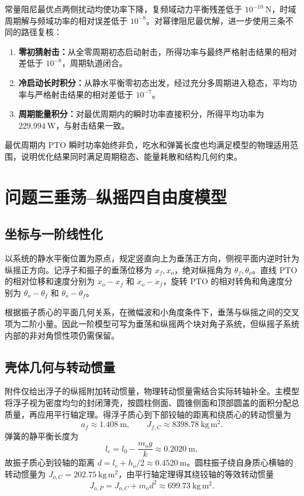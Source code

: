 \documentclass[withoutpreface]{../../../templates/CUMCM2026-Complete-LaTeX/cumcmthesis}
\begin{document}
常量阻尼最优点两侧扰动均使功率下降，复频域动力平衡残差低于 $10^{-10}\ \mathrm{N}$，时域周期解与频域功率的相对误差低于 $10^{-8}$。对幂律阻尼最优解，进一步使用三条不同的路径复核：
\begin{enumerate}[leftmargin=3.2em]
  \item \textbf{零初猜射击：}从全零周期初态启动射击，所得功率与最终严格射击结果的相对差低于 $10^{-8}$，周期轨道闭合。
  \item \textbf{冷启动长时积分：}从静水平衡零初态出发，经过充分多周期进入稳态，平均功率与严格射击结果的相对差低于 $10^{-7}$。
  \item \textbf{周期能量积分：}对最优周期内的瞬时功率直接积分，所得平均功率为 $229.994\ \mathrm{W}$，与射击结果一致。
\end{enumerate}
最优周期内 PTO 瞬时功率始终非负，吃水和弹簧长度也均满足模型的物理适用范围，说明优化结果同时满足周期稳态、能量耗散和结构几何约束。

\section{问题三垂荡--纵摇四自由度模型}

\subsection{坐标与一阶线性化}

以系统的静水平衡位置为原点，规定竖直向上为垂荡正方向，侧视平面内逆时针为纵摇正方向。记浮子和振子的垂荡位移为 $x_f,x_o$，绝对纵摇角为 $\theta_f,\theta_o$。直线 PTO 的相对位移和速度分别为 $x_o-x_f$ 和 $\dot x_o-\dot x_f$，旋转 PTO 的相对转角和角速度分别为 $\theta_o-\theta_f$ 和 $\dot\theta_o-\dot\theta_f$。

根据振子质心的平面几何关系，在微幅波和小角度条件下，垂荡与纵摇之间的交叉项为二阶小量。因此一阶模型可写为垂荡和纵摇两个块对角子系统，但纵摇子系统内部的非对角惯性项仍需保留。

\subsection{壳体几何与转动惯量}

附件仅给出浮子的纵摇附加转动惯量，物理转动惯量需结合实际转轴补全。主模型将浮子视为密度均匀的封闭薄壳，按圆柱侧面、圆锥侧面和顶部圆盖的面积分配总质量，再应用平行轴定理。得浮子质心到下部铰轴的距离和绕质心的转动惯量为
\begin{equation}
  a_f\approx1.408\ \mathrm{m},\qquad
  J_{f,C}\approx8398.78\ \mathrm{kg\,m^2}.
  \label{eq:q3-float-inertia}
\end{equation}
弹簧的静平衡长度为
\begin{equation}
  l_e=l_0-\frac{m_og}{k}\approx0.2020\ \mathrm{m},
  \label{eq:q3-equilibrium-length}
\end{equation}
故振子质心到铰轴的距离 $d=l_e+h_o/2\approx0.4520\ \mathrm{m}$。圆柱振子绕自身质心横轴的转动惯量为 $J_{o,C}=202.75\ \mathrm{kg\,m^2}$，由平行轴定理得其绕铰轴的等效转动惯量
\begin{equation}
  J_{o,P}=J_{o,C}+m_od^2\approx699.73\ \mathrm{kg\,m^2}.
  \label{eq:q3-oscillator-inertia}
\end{equation}
\end{document}
